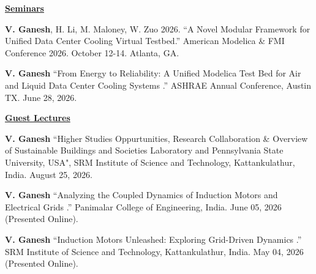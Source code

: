 \documentclass[]{Keval-resume}
\begin{document}
{{%




\textbf{\underline{Seminars}}

\begin{etaremune}
\setlength{\itemsep}{0pt}
    \setlength{\parsep}{0pt}
\item \textbf{V. Ganesh}, H. Li, M. Maloney, W. Zuo 2026. “A Novel Modular Framework for Unified Data Center Cooling Virtual Testbed.” American Modelica \& FMI Conference 2026. October 12-14. Atlanta, GA.
\item \textbf{V. Ganesh} “From Energy to Reliability: A Unified Modelica Test Bed for Air and Liquid Data Center Cooling Systems
.” ASHRAE Annual Conference, Austin TX. June 28, 2026.
\end{etaremune}


\textbf{\underline{Guest Lectures}}

\begin{etaremune}
\setlength{\itemsep}{0pt}
    \setlength{\parsep}{0pt}
\item \textbf{V. Ganesh} “Higher Studies Oppurtunities, Research Collaboration \& Overview of Sustainable Buildings and Societies Laboratory and Pennsylvania State University, USA", SRM Institute of Science and Technology, Kattankulathur, India. August 25, 2026.
\item \textbf{V. Ganesh} “Analyzing the Coupled Dynamics of Induction Motors and Electrical Grids
.” Panimalar College of Engineering, India. June 05, 2026 (Presented Online).
\item \textbf{V. Ganesh} “Induction Motors Unleashed: Exploring Grid-Driven Dynamics
.” SRM Institute of Science and Technology, Kattankulathur, India. May 04, 2026 (Presented Online).
\end{etaremune}




}}
\end{document}
